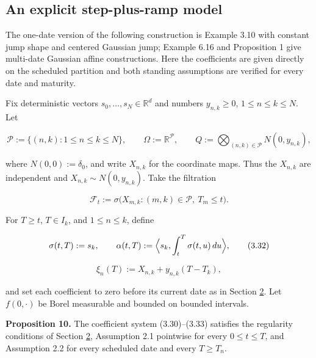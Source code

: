\documentclass[11pt]{article}
\begin{document}
\subsection{An explicit step-plus-ramp model}\label{sec:3.7}

The one-date version of the following construction is \cite{fontana2022term} Example 3.10 with constant jump shape and centered Gaussian jump; \cite{kellerressel2018affine} Example 6.16 and \cite{kim2014jumps} Proposition 1 give multi-date Gaussian affine constructions. Here the coefficients are given directly on the scheduled partition and both standing assumptions are verified for every date and maturity.

Fix deterministic vectors \(s_0, \dots, s_N \in \mathbb R^d\) and numbers \(y_{n,k} \ge 0\), \(1 \le n \le k \le N\). Let

\begin{equation*}
\mathcal P := \{(n,k): 1 \le n \le k \le N\}, \qquad \Omega := \mathbb R^{\mathcal P}, \qquad Q := \bigotimes_{(n,k) \in \mathcal P} N(0,y_{n,k}), \tag{3.30}\label{eq:3.30}
\end{equation*}

where \(N(0,0) := \delta_0\), and write \(X_{n,k}\) for the coordinate maps. Thus the \(X_{n,k}\) are independent and \(X_{n,k} \sim N(0,y_{n,k})\). Take the filtration

\begin{equation*}
\mathcal F_t := \sigma\bigl(X_{m,k}: (m,k) \in \mathcal P,\ T_m \le t\bigr). \tag{3.31}\label{eq:3.31}
\end{equation*}

For \(T \ge t\), \(T \in I_k\), and \(1 \le n \le k\), define

\begin{equation*}
\sigma(t,T) := s_k, \qquad \alpha(t,T) := \Bigl\langle s_k, \int_t^T \sigma(t,u)\,du \Bigr\rangle, \tag{3.32}\label{eq:3.32}
\end{equation*}

\begin{equation*}
\xi_n(T) := X_{n,k} + y_{n,k}(T-T_k), \tag{3.33}\label{eq:3.33}
\end{equation*}

and set each coefficient to zero before its current date as in Section \hyperref[sec:2]{2}. Let \(f(0,\cdot)\) be Borel measurable and bounded on bounded intervals.

\label{res:Proposition-10}
\textbf{Proposition 10.} The coefficient system (3.30)--(3.33) satisfies the regularity conditions of Section \hyperref[sec:2]{2}, Assumption 2.1 pointwise for every \(0 \le t \le T\), and Assumption 2.2 for every scheduled date and every \(T \ge T_n\).
\end{document}
